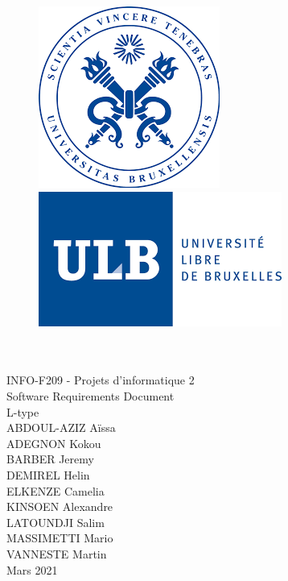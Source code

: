 \documentclass[a4paper,12pt]{article}
\begin{document}
    \begin{titlepage}

        \begin{center}
        
            \begin{figure}[H]
              \begin{minipage}[c]{.46\linewidth}
                    \centering
                    \includegraphics[scale = 0.3]{images/sceau_ulb.png}
                \end{minipage}
                \hfill%
                \begin{minipage}[c]{.46\linewidth}
                    \centering
                    \includegraphics[scale=0.5]{images/logo_ulb.png}
                \end{minipage}
            \end{figure}
        
            {\\[2 cm] \Huge\\INFO-F209 - Projets d'informatique 2 \\ Software Requirements Document \\ [1 cm]
            L-type\\[2 cm]}
            {ABDOUL-AZIZ Aïssa \\[0,2 cm] ADEGNON Kokou  \\[0,2 cm] BARBER Jeremy \\[0,2 cm] DEMIREL Helin \\[0,2 cm] ELKENZE Camelia  \\[0,2 cm] KINSOEN Alexandre  \\[0,2 cm] LATOUNDJI Salim  \\[0,2 cm] MASSIMETTI Mario  \\[0,2 cm] VANNESTE Martin  \\ [2 cm] Mars 2021}
        \end{center}
    \end{titlepage}
\end{document}

